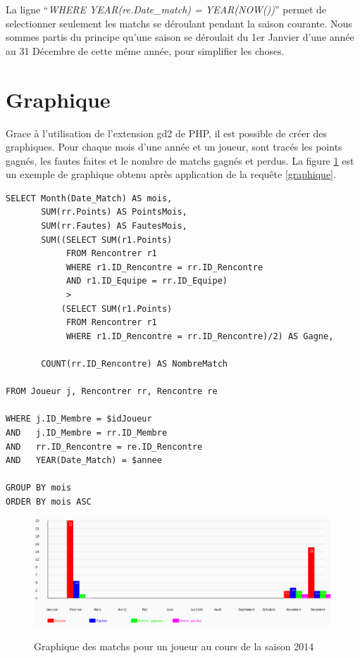 \documentclass[a4paper»,8pt,french,fleqn]{report}
\begin{document}
La ligne ``\textit{WHERE YEAR(re.Date\_match) = YEAR(NOW())}'' permet de selectionner seulement les matchs se déroulant pendant la saison courante. Nous sommes partis du principe qu'une saison se déroulait du 1er Janvier d'une année au 31 Décembre de cette même année, pour simplifier les choses.


\section{Graphique}
Grace à l'utilisation de l'extension gd2 de PHP, il est possible de créer des graphiques. Pour chaque mois d'une année et un joueur, sont tracés les points gagnés, les fautes faites et le nombre de matchs gagnés et perdus. La figure \ref{fig:graph} est un exemple de graphique obtenu après application de la requête \ref{graphique}.

\begin{lstlisting}
SELECT Month(Date_Match) AS mois,
       SUM(rr.Points) AS PointsMois,
       SUM(rr.Fautes) AS FautesMois,
       SUM((SELECT SUM(r1.Points)
            FROM Rencontrer r1
            WHERE r1.ID_Rencontre = rr.ID_Rencontre
            AND r1.ID_Equipe = rr.ID_Equipe)
            >
           (SELECT SUM(r1.Points)
            FROM Rencontrer r1
            WHERE r1.ID_Rencontre = rr.ID_Rencontre)/2) AS Gagne,
    
       COUNT(rr.ID_Rencontre) AS NombreMatch

FROM Joueur j, Rencontrer rr, Rencontre re

WHERE j.ID_Membre = $idJoueur
AND   j.ID_Membre = rr.ID_Membre
AND   rr.ID_Rencontre = re.ID_Rencontre
AND   YEAR(Date_Match) = $annee

GROUP BY mois 
ORDER BY mois ASC
\end{lstlisting}

\begin{figure}[h]
  \centering
    \includegraphics[scale=0.5]{graphe.png}
    \label{fig:graph}
    \caption{Graphique des matchs pour un joueur au cours de la saison 2014}
\end{figure}
\end{document}

